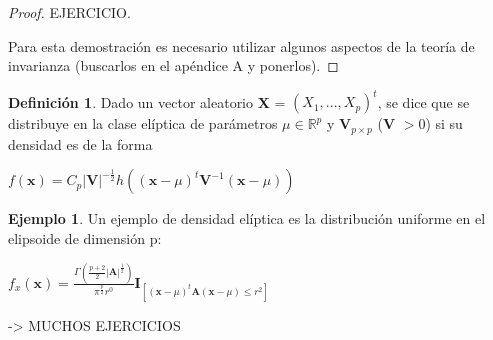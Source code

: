 \documentclass{article}
\theoremstyle{theorem-style}  %
\theoremstyle{definition}
\newtheorem{definition}{Definición}[section]
\theoremstyle{example-style}
\newtheorem{example}{Ejemplo}[section]
\begin{document}
	\begin{proof}
		EJERCICIO.
		
		Para esta demostración es necesario utilizar algunos aspectos de la teoría de invarianza (buscarlos en el apéndice A y ponerlos).
	\end{proof}

	\begin{definition}
		Dado un vector aleatorio \textbf{X} = $(X_1, ..., X_p)^t$, se dice que se distribuye en la clase elíptica de parámetros $\mu \in \mathbb{R}^p$ y \textbf{V}$_{p \times p}$ (\textbf{V} $> 0$) si su densidad es de la forma
		
		\begin{center}
		\begin{math}
			f(\textbf{x}) = C_p|\textbf{V}|^{-\frac{1}{2}}h((\textbf{x}-\mu)^t\textbf{V}^{-1}(\textbf{x}-\mu))
		\end{math}
		\end{center}
	\end{definition}

	\begin{example}
		Un ejemplo de densidad elíptica es la distribución uniforme en el elipsoide de dimensión p:
		
		\begin{center}
			\begin{math}
				f_x(\textbf{x}) = \frac{\Gamma(\frac{p+2}{2}|\textbf{A}|^\frac{1}{2})}{\pi^\frac{p}{2}r^0}\textbf{I}_{[(\textbf{x}-\mu)^t\textbf{A}(\textbf{x}-\mu)\leq r^2]}
			\end{math}
		\end{center}

	\end{example}

	-> MUCHOS EJERCICIOS
	
\end{document}

